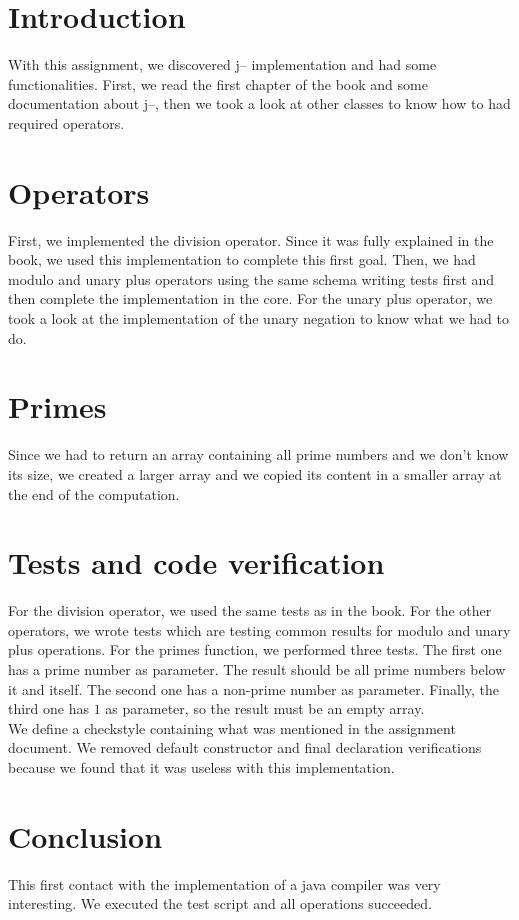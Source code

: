 




\section{Introduction}
With this assignment, we discovered j-- implementation and had some functionalities. First, we read the first chapter of the book and some documentation about j--, then we took a look at other classes to know how to had required operators. 

\section{Operators}
First, we implemented the division operator. Since it was fully explained in the book, we used this implementation to complete this first goal. Then, we had modulo and unary plus operators using the same schema writing tests first and then complete the implementation in the core. For the unary plus operator, we took a look at the implementation of the unary negation to know what we had to do.

\section{Primes}
Since we had to return an array containing all prime numbers and we don't know its size, we created a larger array and we copied its content in a smaller array at the end of the computation.

\section{Tests and code verification}
For the division operator, we used the same tests as in the book. For the other operators, we wrote tests which are testing common results for modulo and unary plus operations.  For the primes function, we performed three tests. The first one has a prime number as parameter. The result should be all prime numbers below it and itself. The second one has a non-prime number as parameter. Finally, the third one has $1$ as parameter, so the result must be an empty array. \\

We define a checkstyle containing what was mentioned in the assignment document. We removed default constructor and final declaration verifications because we found that it was useless with this implementation. 

\section{Conclusion}
This first contact with the implementation of a java compiler was very interesting. We executed the test script and all operations succeeded. 



